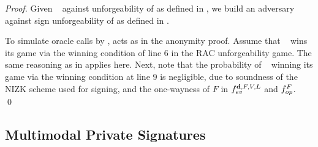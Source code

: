 \begin{proof}
  Given \adv~ against unforgeability of \CUASRAC as defined in
  , we build an adversary \advB against sign
  unforgeability of \CUASGen as defined in .

  To simulate oracle calls by \adv, \advB acts as in the anonymity proof. Assume
  that \adv~ wins its game via the winning condition of line 6 in the RAC
  unforgeability game. The same reasoning as in \CUASAC applies here. Next, note
  that the probability of \adv~ winning its game via the winning condition at
  line 9 is negligible, due to soundness of the NIZK scheme used for signing,
  and the one-wayness of $F$ in $f_{ev}^{\mathbf{d},F,V,L}$ and $f_{op}^{F}$.  
  \qed
\end{proof}


\subsection{Multimodal Private Signatures}
\label{sapp:related-models-mps}


